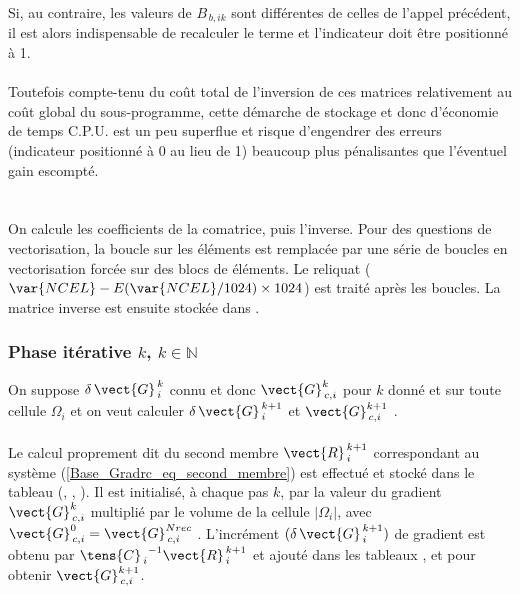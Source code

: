 {Si, au contraire, les valeurs de $B_{\,b,ik}$  sont diff\'erentes de celles de
l'appel pr\'ec\'edent, il est alors
indispensable de recalculer le terme et l'indicateur  doit \^etre
positionn\'e \`a 1.\\\\
Toutefois compte-tenu du co\^ut total de l'inversion de ces matrices relativement
au co\^ut global du sous-programme, cette d\'emarche de stockage et donc
d'\'economie de temps C.P.U. est un peu
superflue et risque d'engendrer des erreurs (indicateur 
positionn\'e \`a 0 au lieu de 1) beaucoup plus p\'enalisantes que l'\'eventuel
gain escompt\'e.\\\\
\hspace*{1,5cm}{\bf Inversion de la matrice}\\
On calcule les coefficients de la comatrice, puis l'inverse.
Pour des questions de vectorisation, la boucle sur les  \'el\'ements
est remplac\'ee par une
s\'erie de boucles en vectorisation forc\'ee sur des blocs de 
\'el\'ements. Le reliquat ($\var{NCEL}-E(\var{NCEL}/1024)\times 1024$) est
trait\'e apr\`es les boucles.
La matrice inverse est ensuite stock\'ee dans .\\
\hspace*{1cm}\subsubsection*{\bf Phase it\'erative $k$, $k\in \mathbb{N}$}
On suppose  $\delta\,\vect{G}^{\,k}_{\,i}$ connu et donc  $\vect{G}^{k}_{\,c,i}$ pour $k$ donn\'e et sur
toute cellule $\Omega_{i}$ et on veut calculer
$\delta\,\vect{G}^{\,k+1}_{\,i}$ et $\vect{G}^{k+1}_{\,c,i}$ .\\

\\
Le calcul proprement dit du second membre ${\vect{R}^{\,k+1}_{\,i}} $
correspondant au syst\`eme (\ref{Base_Gradrc_eq_second_membre}) est effectu\'e et stock\'e
dans le tableau (, , ). Il est initialis\'e, \`a chaque
pas $k$, par la
valeur du gradient $\vect{G}^{k}_{\,c,i}$ multipli\'e par le
volume de la cellule $|\Omega_i|$, avec $\vect{G}^{0}_{\,c,i} = \vect{G}^{Nrec}_{\,c,i}$ . L'incr\'ement $(\delta\,\vect{G}^{\,k+1}_{\,i})$
de gradient est obtenu par $ {\tens{C}_{\,i}}^{-1}{\vect{R}^{\,k+1}_{\,i}}$ et
ajout\'e dans les tableaux ,
 et  pour obtenir $\vect{G}^{k+1}_{\,c,i}$.\\

}
